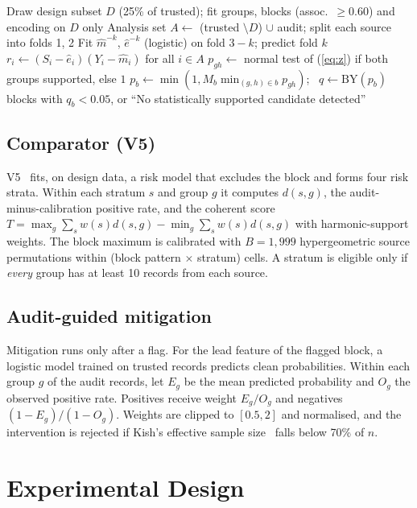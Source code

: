 \documentclass[conference]{IEEEtran}
\newcommand{\Vsix}{V6}
\newcommand{\Vfive}{V5}
\begin{document}
\begin{algorithm}[t]
\caption{\Vsix{} candidate feature audit}
\label{alg:v6}
\footnotesize
\begin{algorithmic}[1]
\State Draw design subset $D$ (25\% of trusted); fit groups, blocks (assoc.\ $\ge 0.60$) and encoding on $D$ only
\State Analysis set $A \gets$ (trusted $\setminus D$) $\cup$ audit; split each source into folds 1, 2
  \State Fit $\hat m^{-k}$, $\hat e^{-k}$ (logistic) on fold $3-k$; predict fold $k$
\EndFor
\State $r_i \gets (S_i-\hat e_i)(Y_i-\hat m_i)$ for all $i \in A$
  \State $p_{gh} \gets$ normal test of (\ref{eq:z}) if both groups supported, else $1$
\EndFor
\State $p_b \gets \min(1, M_b \min_{(g,h)\in b} p_{gh})$; \ $q \gets \mathrm{BY}(p_b)$
\State \Return blocks with $q_b<0.05$, or ``No statistically supported candidate detected''
\end{algorithmic}
\end{algorithm}

\subsection{Comparator (V5)}
\Vfive{}~\cite{salwan2026report} fits, on design data, a risk model that excludes the block and forms four risk strata. Within each stratum $s$ and group $g$ it computes $d(s,g)$, the audit-minus-calibration positive rate, and the coherent score $T=\max_g\sum_s w(s)d(s,g)-\min_g\sum_s w(s)d(s,g)$ with harmonic-support weights. The block maximum is calibrated with $B=1{,}999$ hypergeometric source permutations within (block pattern $\times$ stratum) cells. A stratum is eligible only if \emph{every} group has at least 10 records from each source.

\subsection{Audit-guided mitigation}
Mitigation runs only after a flag. For the lead feature of the flagged block, a logistic model trained on trusted records predicts clean probabilities. Within each group $g$ of the audit records, let $E_g$ be the mean predicted probability and $O_g$ the observed positive rate. Positives receive weight $E_g/O_g$ and negatives $(1-E_g)/(1-O_g)$. Weights are clipped to $[0.5,2]$ and normalised, and the intervention is rejected if Kish's effective sample size~\cite{kish1965survey} falls below 70\% of $n$.

\section{Experimental Design}
\end{document}
